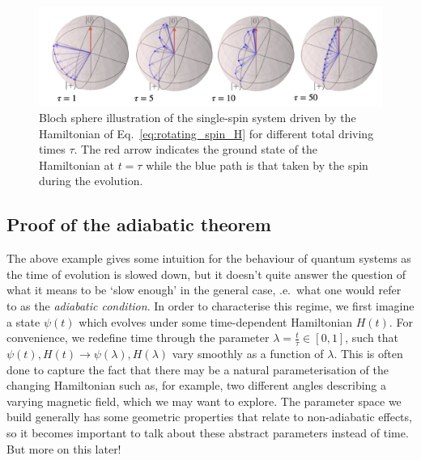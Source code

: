     \begin{figure}[t]
    \centering
    \includegraphics[width=0.9\linewidth]{images/magnetic_field_spin.png} \caption[Rotating spin Bloch sphere illustrations]{Bloch sphere illustration of the single-spin system driven by the Hamiltonian of Eq.~\eqref{eq:rotating_spin_H} for different total driving times $\tau$. The red arrow indicates the ground state of the Hamiltonian at $t = \tau$ while the blue path is that taken by the spin during the evolution.}\label{fig:bloch_rotating_spin}
    \end{figure}

    \subsection{Proof of the adiabatic theorem}\label{sec:2.1.1_proof_adiabatic_theorem}

    The above example gives some intuition for the behaviour of quantum systems as the time of evolution is slowed down, but it doesn't quite answer the question of what it means to be `slow enough' in the general case, \@i.e.~what one would refer to as the \emph{adiabatic condition}. In order to characterise this regime, we first imagine a state $\psi(t)$ which evolves under some time-dependent Hamiltonian $H(t)$. For convenience, we redefine time through the parameter $\lambda = \frac{t}{\tau} \in [0,1]$, such that $\psi(t), H(t) \rightarrow \psi(\lambda), H(\lambda)$ vary smoothly as a function of $\lambda$. This is often done to capture the fact that there may be a natural parameterisation of the changing Hamiltonian such as, for example, two different angles describing a varying magnetic field, which we may want to explore. The parameter space we build generally has some geometric properties that relate to non-adiabatic effects, so it becomes important to talk about these abstract parameters instead of time. But more on this later!
    
